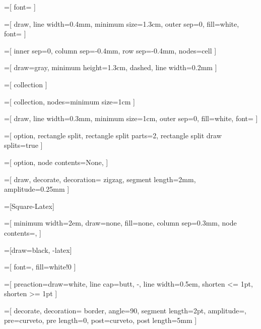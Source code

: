\newcommand{\true}{\textcolor{green}{\ding{51}}}
\newcommand{\false}{\textcolor{red}{\ding{55}}}

=[
  font=\large
]

=[
  draw,
  line width=0.4mm,
  minimum size=1.3cm,
  outer sep=0,
  fill=white,
  font=\large
]

=[
  inner sep=0,
  column sep=-0.4mm,
  row sep=-0.4mm,
  nodes=cell
]

=[
  draw=gray,
  minimum height=1.3cm,
  dashed,
  line width=0.2mm
]

=[
  collection
]

=[
  collection,
  nodes={minimum size=1cm}
]

=[
  draw,
  line width=0.3mm,
  minimum size=1cm,
  outer sep=0,
  fill=white,
  font=\large
]

=[
  option,
  rectangle split,
  rectangle split parts=2,
  rectangle split draw splits=true
]

=[
  option,
  node contents={\small None},
]

=[
  draw,
  decorate,
  decoration={
    zigzag,
    segment length=2mm,
    amplitude=0.25mm
  }
]

=[Square-Latex]


\newcommand{\ellipsis}[1][15mm]{ \node [ellipsis=#1]; }
\newcommand{\vellipsis}[1][15mm]{ \node [vertical ellipsis=#1]; }

=[
  minimum width=2em,
  draw=none,
  fill=none,
  column sep=0.3mm,
  node contents={,}
]

\newcommand{\tuplecomma}{ \node [tuple comma]; }

=[draw=black, -latex]

=[
  font=\small,
  fill=white!0
]

=[
  preaction={draw=white, line cap=butt, -, line width=0.5em},
  shorten <= 1pt,
  shorten >= 1pt
]

=[
  decorate,
  decoration={
    border, angle=90, segment length=2pt, amplitude=\pgflinewidth,
    pre=curveto, pre length=0, post=curveto, post length=5mm
  }
]

